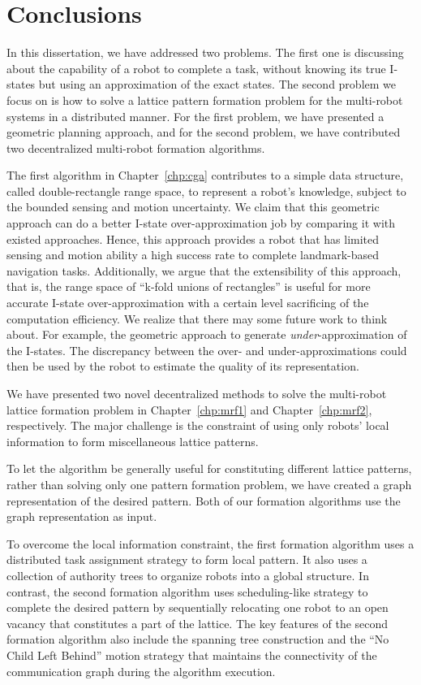 \chapter{Conclusions}
\label{chp:conc}

In this dissertation, we have addressed two problems. 
The first one is discussing about the capability of a robot to complete a task, without knowing its true I-states but using an approximation of the exact states.
%
The second problem we focus on is how to solve a lattice pattern formation problem for the multi-robot systems in a distributed manner. 
%
For the first problem, we have presented a geometric planning approach, and for the second problem, we have contributed two decentralized multi-robot formation algorithms.


The first algorithm in Chapter~\ref{chp:cga} contributes to a simple data structure, called double-rectangle range space, to represent a robot's knowledge, subject to the bounded sensing and motion uncertainty. 
%
We claim that this geometric approach can do a better I-state over-approximation job by comparing it with existed approaches. 
%
Hence, this approach provides a robot that has limited sensing and motion ability a high success rate to complete landmark-based navigation tasks.
%
Additionally, we argue that the extensibility of this approach, that is, the range space of ``k-fold unions of rectangles'' is useful for more accurate I-state over-approximation with a certain level sacrificing of the computation efficiency.
%
We realize that there may some future work to think about. 
For example, the geometric approach to
generate \emph{under}-approximation of the I-states.  
%
The discrepancy between the over- and under-approximations could then be used by the robot to estimate the quality of its representation.

We have presented two novel decentralized methods to solve the multi-robot lattice formation problem in Chapter~\ref{chp:mrf1} and Chapter~\ref{chp:mrf2}, respectively. 
%
The major challenge is the constraint of using only robots' local information to form miscellaneous lattice patterns.  

To let the algorithm be generally useful for constituting different lattice patterns, rather than solving only one pattern formation problem, we have created a graph representation of the desired pattern.
%
Both of our formation algorithms use the graph representation as input.


To overcome the local information constraint, the first formation algorithm uses a distributed task assignment strategy to form local pattern. 
%
It also uses a collection of authority trees to organize robots into a global structure.
%
In contrast, the second formation algorithm uses scheduling-like strategy to complete the desired pattern by sequentially relocating one robot to an open vacancy that constitutes a part of the lattice. 
%
The key features of the second formation algorithm also include the spanning tree construction and the ``No Child Left Behind'' motion strategy that maintains the connectivity of the communication graph during the algorithm execution.


